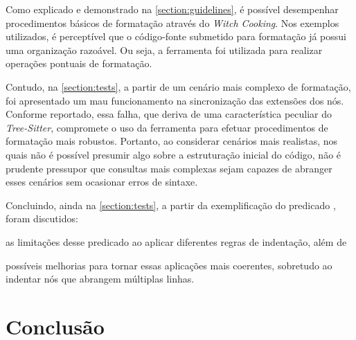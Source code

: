 \documentclass
  [11pt,a4paper,english,brazil,openright,sumario=tradicional,twoside]
  {abntex2}
\newcommand{\treesitter}{\textit{Tree-Sitter}\xspace}
\newcommand{\witchcooking}{\textit{Witch Cooking}\xspace}
\begin{document}
  Como explicado e demonstrado na \cref{section:guidelines}, é possível
  desempenhar procedimentos básicos de formatação através do \witchcooking. Nos
  exemplos utilizados, é perceptível que o código-fonte submetido para
  formatação já possui uma organização razoável. Ou seja, a ferramenta foi
  utilizada para realizar operações pontuais de formatação.

  Contudo, na \cref{section:tests}, a partir de um cenário mais complexo de
  formatação, foi apresentado um mau funcionamento na sincronização das
  extensões dos nós. Conforme reportado, essa falha, que deriva de uma
  característica peculiar do \treesitter, compromete o uso da ferramenta para
  efetuar procedimentos de formatação mais robustos. Portanto, ao considerar
  cenários mais realistas, nos quais não é possível presumir algo sobre a
  estruturação inicial do código, não é prudente pressupor que consultas mais
  complexas sejam capazes de abranger esses cenários sem ocasionar erros de
  sintaxe.

  Concluindo, ainda na \cref{section:tests}, a partir da exemplificação do
  predicado , foram discutidos:
  \begin{inparaenum}
    \item as limitações desse predicado ao aplicar diferentes regras de
          indentação, além de
    \item possíveis melhorias para tornar essas aplicações mais coerentes,
          sobretudo ao indentar nós que abrangem múltiplas linhas.
  \end{inparaenum}


  \chapter{Conclusão}
\end{document}
